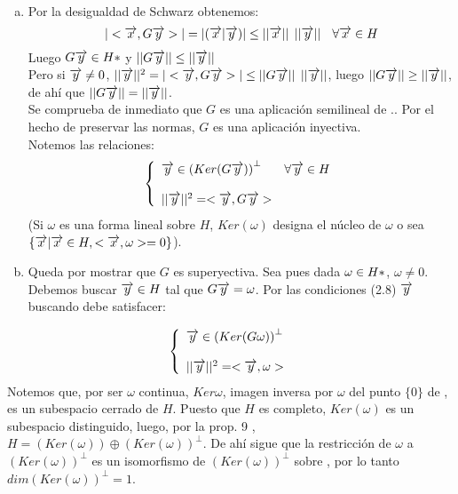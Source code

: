 \begin{enumerate}[a)]
\item Por la desigualdad de Schwarz obtenemos:
\begin{equation}
| <\overrightarrow{x}, G\overrightarrow{y}>|=|(\overrightarrow{x} | \overrightarrow{y}) | \leq || \overrightarrow{x} || \phantom{s} || \overrightarrow{y} || \phantom{ss} \forall \overrightarrow{x} \in H
\end{equation}
Luego $G\overrightarrow{y} \in H*$ y $||G \overrightarrow{y} || \leq || \overrightarrow{y} ||$ \\
Pero si $\overrightarrow{y} \neq 0$, $|| \overrightarrow{y} ||^2=| < \overrightarrow{y} , G\overrightarrow{y} >| \leq || G\overrightarrow{y} || \phantom{s} ||\overrightarrow{y}||$, luego $||G \overrightarrow{y} || \geq || \overrightarrow{y} ||$, de ahí que $|| G\overrightarrow{y} || = || \overrightarrow{y} ||$. \\
Se comprueba de inmediato que $G$ es una aplicación semilineal de .. Por el hecho de preservar las normas, $G$ es una aplicación inyectiva.\\

Notemos las relaciones: \\
\begin{equation}
 \left\{ \begin{array}{lcc}
           \overrightarrow{y} \in {(Ker(G\ensuremath{\overrightarrow{y}}))}^\perp   & \forall \overrightarrow{y} \in H \\
             \\  || \overrightarrow{y} ||^2= <\overrightarrow{y},G\overrightarrow{y} > \\
             \end{array}
   \right.
\end{equation}
(Si $\omega$ es una forma lineal sobre $H$, $Ker(\omega)$ designa el núcleo de $\omega$ o sea $\lbrace \overrightarrow{x} | \overrightarrow{x} \in H, <\overrightarrow{x}, \omega>=0 \rbrace$). \\
\item Queda por mostrar que $G$ es superyectiva. Sea pues dada $\omega \in H*$, $\omega \neq 0$. Debemos buscar $\overrightarrow{y} \in H$ tal que $G\overrightarrow{y}=\omega$. Por las condiciones (2.8) $\overrightarrow{y}$ buscando debe satisfacer:
\end{enumerate}
\begin{equation}
 \left\{ \begin{array}{lcc}
           \overrightarrow{y} \in {(Ker(G\omega))}^\perp \\
             \\  || \overrightarrow{y} ||^2= <\overrightarrow{y},\omega > \\
             \end{array}
   \right.
\end{equation}
Notemos que, por ser $\omega$ continua, $Ker \omega$, imagen inversa por $\omega$  del punto $\lbrace 0 \rbrace$ de \K , es un subespacio cerrado de $H$. Puesto que $H$ es completo, $Ker(\omega)$ es un subespacio distinguido, luego, por la prop. 9 , $H=(Ker(\omega)) \oplus {(Ker(\omega))}^\perp$. De ahí sigue que la restricción de $\omega$ a  ${(Ker(\omega))}^\perp$ es un isomorfismo de ${(Ker(\omega))}^\perp$ sobre \K , por lo tanto $dim{(Ker(\omega))}^\perp=1$. \\
